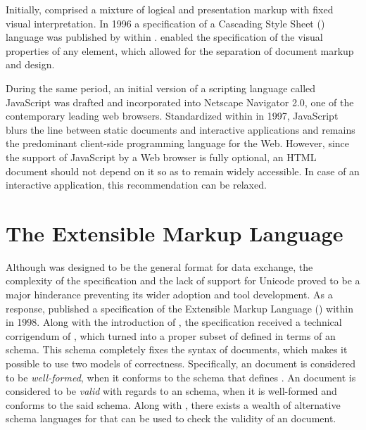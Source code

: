 \documentclass[b5paper]{book}
\begin{document}

        Initially,  comprised a mixture of logical and
        presentation markup with fixed visual interpretation. In 1996 a
        specification of a Cascading Style Sheet () language was
        published by  within \cite{lie96}.  enabled
        the specification of the visual properties of any element, which allowed
        for the separation of document markup and design.


        During the same period, an initial version of a scripting language
        called JavaScript was drafted and incorporated into Netscape Navigator
        2.0, one of the contemporary leading web browsers. Standardized within
        \cite{ecma1} in 1997, JavaScript blurs the line between static documents
        and interactive applications and remains the predominant client-side
        programming language for the Web. However, since the support of
        JavaScript by a Web browser is fully optional, an HTML document should
        not depend on it so as to remain widely accessible. In case of an
        interactive application, this recommendation can be relaxed.


      \section{The Extensible Markup Language}
        Although  was designed to be the general format for data
        exchange, the complexity of the specification and the lack of support
        for Unicode proved to be a major hinderance preventing its wider
        adoption and tool development. As a response,  published a
        specification of the Extensible Markup Language () within
        \cite{bray98} in 1998. Along with the introduction of , the
         specification received a technical corrigendum of
        \cite{goldfarb97:webSGML}, which turned  into a proper
        subset of  defined in terms of an 
         schema. This schema completely fixes the syntax of
         documents, which makes it possible to use two models of
        correctness. Specifically, an  document is considered to be
        \emph{well-formed}, when it conforms to the  
        schema that defines . An  document is
        considered to be \emph{valid} with regards to an  schema,
        when it is well-formed and conforms to the said  schema.
        Along with , there exists a wealth of alternative schema
        languages for  that can be used to check the validity of an
         document.
\end{document}

